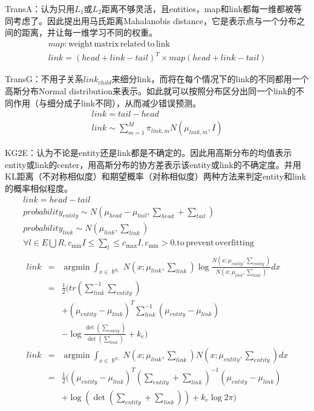 \documentclass[12pt]{ctexart}
\DeclareMathOperator\argmin{argmin}
\DeclareMathOperator\R{\mathbb{R}}
\theoremstyle{definition}
\begin{document}
TransA：认为只用$L_1$或$L_2$距离不够灵活，且entities，map和link都每一维都被等同考虑了。因此提出用马氏距离Mahalanobis distance，它是表示点与一个分布之间的距离，并让每一维学习不同的权重。
\[\begin{array}{l}
    map: \mathrm{weight \,matrix\, related \,to\, link}\\
    link=(head+link-tail)^T \times map (head+link-tail)
\end{array}\]

TransG：不用子关系$link_{child}$来细分link，而将在每个情况下的link的不同都用一个高斯分布Normal distribution来表示。如此就可以按照分布区分出同一个link的不同作用（与细分成子link不同），从而减少错误预测。
\[\begin{array}{l}
    link=tail-head\\
    link \sim \sum\limits_{m=1}^M \pi_{link, m} N(\mu_{link, m}, I)
\end{array}\]

KG2E：认为不论是entity还是link都是不确定的。因此用高斯分布的均值表示entity或link的center，用高斯分布的协方差表示该entity或link的不确定度。并用KL距离（不对称相似度）和期望概率（对称相似度）两种方法来判定entity和link的概率相似程度。
\[\begin{array}{l}
    link=head-tail\\
    probability_{entity} \sim N (\mu_{head}-\mu_{tail}, \sum_{head}+\sum_{tail})\\
    probability_{link} \sim N(\mu_{link},\sum_{link})\\
    \forall l \in E\bigcup R, c_{\min} I\leq \sum_{l}\leq c_{\max} I,c_{\min}>0.\mathrm{to\, prevent\, overfitting}\\
    \begin{array}{lll}
        link&=&\argmin \int_{x\in \R^{k_e}} N(x;\mu_{link},\sum_{link}) \log\frac{N(x;\mu_{entity},\sum_{entity})}{N(x;\mu_{link},\sum_{link})} dx\\
        &=&\frac{1}{2} ( tr(\sum\limits_{link}^{-1}\sum\limits_{entity})\\
        && +(\mu_{entity}-\mu_{link})^T\sum\limits_{link}^{-1}(\mu_{entity}-\mu_{link})\\
        && -\log\frac{\det(\sum_{entity})}{\det(\sum_{link})}+k_e)\\
        link&=&\argmin \int_{x\in\R^{k_e}} N(x;\mu_{link},\sum_{link})N(x;\mu_{entity},\sum_{entity}) dx\\
        &=& \frac{1}{2} ((\mu_{entity}-\mu_{link})^T(\sum_{entity}+\sum_{link})^{-1}(\mu_{entity}-\mu_{link})\\
        && +\log(\det(\sum_{entity}+\sum_{link}))+k_e\log 2\pi)
    \end{array}
\end{array}\]
 
\end{document}
